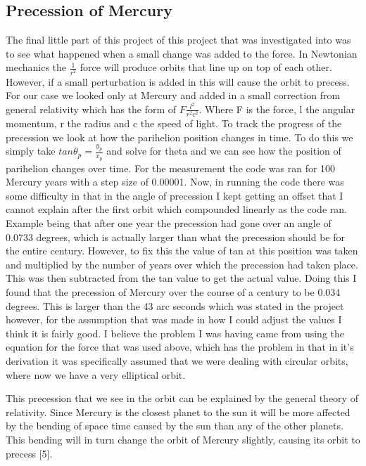 \documentclass[12pt,righttag]{article}
\begin{document}
		\subsection{Precession of Mercury}
		The final little part of this project of this project that was investigated into was to see what happened when a small change was added to the force. In Newtonian mechanics the $\frac{1}{r^2}$ force will produce orbits that line up on top of each other. However, if a small perturbation is added in this will cause the orbit to precess. For our case we looked only at Mercury and added in a small correction from general relativity which has the form of $F\frac{l^2}{r^2c^2}$. Where F is the force, l the angular momentum, r the radius and c the speed of light. To track the progress of the precession we look at how the parihelion position changes in time. To do this we simply take $tan\theta_p=\frac{y_p}{x_p}$ and solve for theta and we can see how the position of parihelion changes over time. For the measurement the code was ran for 100 Mercury years with a step size of 0.00001. Now, in running the code there was some difficulty in that in the angle of precession I kept getting an offset that I cannot explain after the first orbit which compounded linearly as the code ran. Example being that after one year the precession had gone over an angle of 0.0733 degrees, which is actually larger than what the precession should be for the entire century. However, to fix this the value of tan at this position was taken and multiplied by the number of years over which the precession had taken place. This was then subtracted from the tan value to get the actual value. Doing this I found that the precession of Mercury over the course of a century to be 0.034 degrees. This is larger than the 43 arc seconds which was stated in the project however, for the assumption that was made in how I could adjust the values I think it is fairly good. I believe the problem I was having came from using the equation for the force that was used above, which has the problem in that in it's derivation it was specifically assumed that we were dealing with circular orbits, where now we have a very elliptical orbit. 
		
		This precession that we see in the orbit can be explained by the general theory of relativity. Since Mercury is the closest planet to the sun it will be more affected by the bending of space time caused by the sun than any of the other planets. This bending will in turn change the orbit of Mercury slightly, causing its orbit to precess [5].
		
\end{document}
